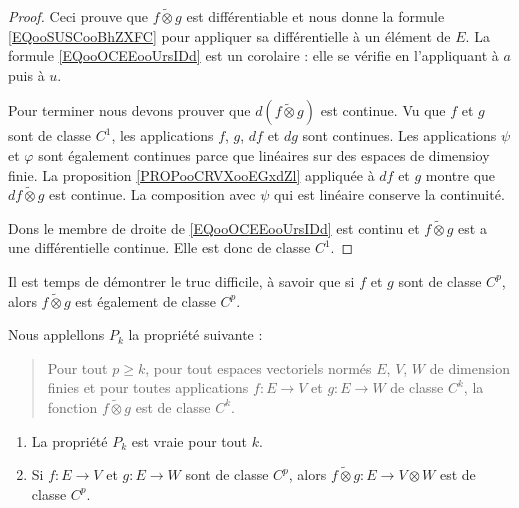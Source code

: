 \begin{proof}
    Ceci prouve que \( f\tilde\otimes g\) est différentiable et nous donne la formule \eqref{EQooSUSCooBhZXFC} pour appliquer sa différentielle à un élément de \( E\). La formule \eqref{EQooOCEEooUrsIDd} est un corolaire : elle se vérifie en l'appliquant à \( a\) puis à \( u\).
    
    Pour terminer nous devons prouver que \( d(f\tilde\otimes g)\) est continue. Vu que \( f\) et \( g\) sont de classe \( C^1\), les applications \( f\), \( g\), \( df\) et \( dg\) sont continues. Les applications \( \psi\) et \( \varphi\) sont également continues parce que linéaires sur des espaces de dimensioy finie. La proposition \ref{PROPooCRVXooEGxdZl} appliquée à \( df\) et \( g\) montre que \( df\tilde\otimes g\) est continue. La composition avec \( \psi\) qui est linéaire conserve la continuité.

    Dons le membre de droite de \eqref{EQooOCEEooUrsIDd} est continu et \( f\tilde\otimes g\) est a une différentielle continue. Elle est donc de classe \( C^1\).
\end{proof}

Il est temps de démontrer le truc difficile, à savoir que si \( f\) et \( g\) sont de classe \( C^p\), alors \( f\tilde\otimes g\) est également de classe \( C^p\). 

\begin{proposition}     \label{PROPooAWZFooMlhoCN}
    Nous applellons \( P_k\) la propriété suivante :
    \begin{quote}
        Pour tout \( p\geq k\), pour tout espaces vectoriels normés \( E\), \( V\), \( W\) de dimension finies et pour toutes applications \( f\colon E\to V\) et \( g\colon E\to W\) de classe \( C^k\), la fonction \( f\tilde\otimes g\) est de classe \( C^k\).
    \end{quote}
    \begin{enumerate}
        \item       \label{ITEMooDQRYooAEdxrW}
            La propriété \( P_k\) est vraie pour tout \( k\).
        \item       \label{ITEMooUUIFooGDyTMM}
            Si \( f\colon E\to V\) et \( g\colon E\to W\) sont de classe \( C^p\), alors \( f\tilde\otimes g\colon E\to V\otimes W\) est de classe \( C^p\).
    \end{enumerate}
\end{proposition}

